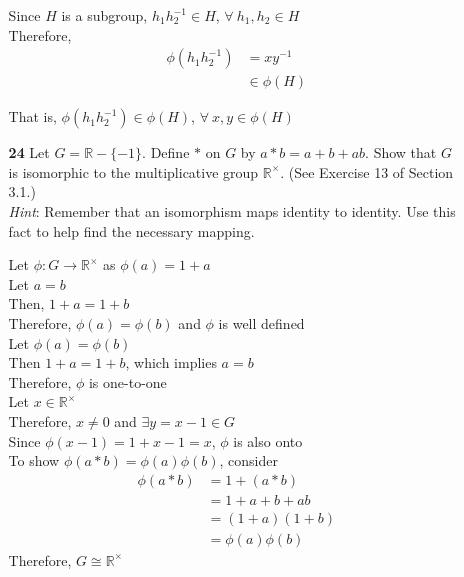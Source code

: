 \documentclass[paper=usletter, fontsize=12pt]{article}
\begin{document}
\begin{itemize}
\begin{itemize}
\begin{cproof}
                Since $H$ is a subgroup, $h_1h_2^{-1}\in H$, $\forall \ h_1,h_2
                \in H$\\
                Therefore,
                \begin{align*}
                    \phi(h_1h_2^{-1}) & = xy^{-1}\\
                    & \in \phi(H)
                \end{align*}

                That is, $\phi(h_1h_2^{-1}) \in \phi(H)$, $\forall \ x,y \in
                \phi(H)$ \qedhere

            \end{cproof}

            \item[\textbf{24}] Let $G = \mathbb{R} - \{-1\}$. Define $*$ on $G$
            by $a*b = a+b+ab$. Show that $G$ is isomorphic to the
            multiplicative group $\mathbb{R}^{\times}$. (See Exercise 13 of
            Section 3.1.) \\ \textit{Hint}: Remember that an isomorphism maps
            identity to identity. Use this fact to help find the necessary
            mapping.
            \begin{cproof}

                Let $\phi: G \rightarrow \mathbb{R}^{\times}$ as
                $\phi(a)=1+a$\\

                Let $a=b$\\
                Then, $1+a=1+b$\\
                Therefore, $\phi(a)=\phi(b)$ and $\phi$ is well defined\\

                Let $\phi(a)=\phi(b)$\\
                Then $1+a=1+b$, which implies $a=b$\\
                Therefore, $\phi$ is one-to-one\\

                Let $x \in \mathbb{R}^{\times}$\\
                Therefore, $x \neq 0$ and $\exists{y = x-1} \in G$\\
                Since $\phi(x-1)=1+x-1=x$, $\phi$ is also onto\\

                To show $\phi(a*b)=\phi(a)\phi(b)$, consider
                \begin{align*}
                    \phi(a*b) & = 1+(a*b)\\
                    & = 1 + a + b + ab\\
                    & = (1+a)(1+b)\\
                    & = \phi(a)\phi(b)
                \end{align*}
                Therefore, $G \cong \mathbb{R}^{\times}$ \qedhere


\end{cproof}
\end{itemize}
\end{itemize}
\end{document}
